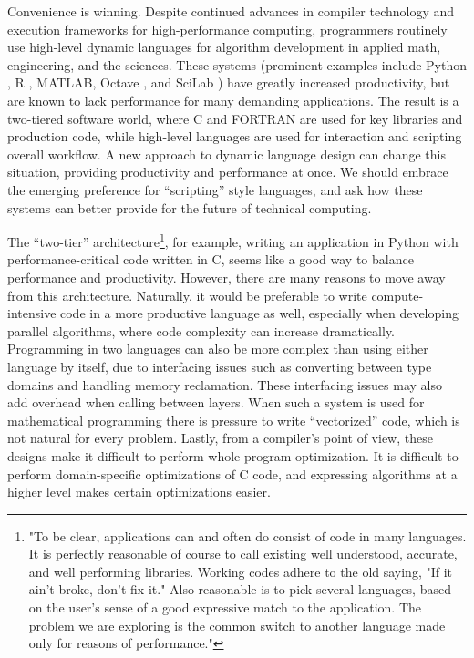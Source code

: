 \documentclass[11pt]{sigplanconf}
\begin{document}
Convenience is winning. Despite continued advances in compiler technology
and execution frameworks for high-performance computing, programmers
routinely use high-level dynamic languages for algorithm
development in applied math, engineering,  and the sciences. These systems
(prominent examples include Python \cite{numpy}, R \cite{Rlang},
MATLAB\textregistered, Octave \cite{Octave}, and SciLab \cite{scilab})
have greatly increased
productivity, but are known to lack performance for many demanding applications.
The result is a two-tiered software world, where
C and FORTRAN are used for key libraries and production code, while
high-level languages are used for interaction and scripting overall workflow.
A new approach to dynamic language design can
change this situation, providing productivity and performance at once. We
should embrace the emerging preference for ``scripting'' style languages,
and ask how these systems can better provide for the future of technical
computing.

The ``two-tier'' architecture\footnote{  "To be clear, applications can and often do consist of code in many languages.  It is perfectly reasonable of course to call existing well understood, accurate, and well performing libraries.
Working codes adhere to the old saying, "If it ain't broke, don't fix it." Also reasonable
is to pick several languages, based on the user's sense of a good expressive match to the
application.  The problem we are exploring  is the common switch to another language made only for reasons of performance."}, for example, writing an application in
Python with performance-critical code written in C, seems like a good way
to balance performance and productivity. However, there are many reasons
to move away from this architecture.
Naturally, it would be preferable to write compute-intensive code in a
more productive language as well, especially when developing parallel
algorithms, where code complexity can increase dramatically.
Programming in two languages can also be more complex
than using either language by itself, due to interfacing issues such as
converting between type domains and handling memory reclamation.
These interfacing
issues may also add overhead when calling between layers. When such a
system is used for mathematical programming there is pressure to write
``vectorized'' code, which is not natural for every problem. Lastly, from
a compiler's point of view, these designs make it difficult to perform
whole-program optimization. It is difficult to perform domain-specific
optimizations of C code, and expressing algorithms at a higher level
makes certain optimizations easier.
\end{document}
